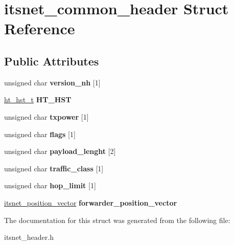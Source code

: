 \hypertarget{structitsnet__common__header}{\section{itsnet\-\_\-common\-\_\-header \-Struct \-Reference}
\label{structitsnet__common__header}
}
\subsection*{\-Public \-Attributes}
\begin{DoxyCompactItemize}
\item 
\hypertarget{structitsnet__common__header_acfa3fa47bccc4286a48281b0062e5196}{unsigned char {\bfseries version\-\_\-nh} \mbox{[}1\mbox{]}}\label{structitsnet__common__header_acfa3fa47bccc4286a48281b0062e5196}

\item 
\hypertarget{structitsnet__common__header_a166608bbe0fa95926bfe3954cc7289f7}{\hyperlink{structht__hst__t}{ht\-\_\-hst\-\_\-t} {\bfseries \-H\-T\-\_\-\-H\-S\-T}}\label{structitsnet__common__header_a166608bbe0fa95926bfe3954cc7289f7}

\item 
\hypertarget{structitsnet__common__header_ad8a2399d9f96ee77e37a73e0c2d7dfa7}{unsigned char {\bfseries txpower} \mbox{[}1\mbox{]}}\label{structitsnet__common__header_ad8a2399d9f96ee77e37a73e0c2d7dfa7}

\item 
\hypertarget{structitsnet__common__header_aceb2106fba1a6adf76abddfad64b64f2}{unsigned char {\bfseries flags} \mbox{[}1\mbox{]}}\label{structitsnet__common__header_aceb2106fba1a6adf76abddfad64b64f2}

\item 
\hypertarget{structitsnet__common__header_a08615501d396f6aa82425a431d5fea9f}{unsigned char {\bfseries payload\-\_\-lenght} \mbox{[}2\mbox{]}}\label{structitsnet__common__header_a08615501d396f6aa82425a431d5fea9f}

\item 
\hypertarget{structitsnet__common__header_a56ee904ba23a671312d2378fa63d49b1}{unsigned char {\bfseries traffic\-\_\-class} \mbox{[}1\mbox{]}}\label{structitsnet__common__header_a56ee904ba23a671312d2378fa63d49b1}

\item 
\hypertarget{structitsnet__common__header_a630af9c04d77fb9442ce1ade3ca6b4b0}{unsigned char {\bfseries hop\-\_\-limit} \mbox{[}1\mbox{]}}\label{structitsnet__common__header_a630af9c04d77fb9442ce1ade3ca6b4b0}

\item 
\hypertarget{structitsnet__common__header_a08f3952ff3aaab3035a649a9112d0a52}{\hyperlink{structitsnet__position__vector}{itsnet\-\_\-position\-\_\-vector} {\bfseries forwarder\-\_\-position\-\_\-vector}}\label{structitsnet__common__header_a08f3952ff3aaab3035a649a9112d0a52}

\end{DoxyCompactItemize}


\-The documentation for this struct was generated from the following file\-:\begin{DoxyCompactItemize}
\item 
itsnet\-\_\-header.\-h\end{DoxyCompactItemize}
